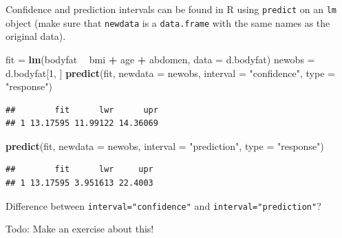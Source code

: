 \documentclass[10pt,ignorenonframetext,]{beamer}
\newenvironment{Shaded}{\begin{snugshade}}{\end{snugshade}}
\newcommand{\KeywordTok}[1]{\textcolor[rgb]{0.13,0.29,0.53}{\textbf{#1}}}
\newcommand{\DataTypeTok}[1]{\textcolor[rgb]{0.13,0.29,0.53}{#1}}
\newcommand{\DecValTok}[1]{\textcolor[rgb]{0.00,0.00,0.81}{#1}}
\newcommand{\StringTok}[1]{\textcolor[rgb]{0.31,0.60,0.02}{#1}}
\newcommand{\OperatorTok}[1]{\textcolor[rgb]{0.81,0.36,0.00}{\textbf{#1}}}
\newcommand{\NormalTok}[1]{#1}
\begin{document}
\begin{frame}[fragile]

Confidence and prediction intervals can be found in R using
\texttt{predict} on an \texttt{lm} object (make sure that
\texttt{newdata} is a \texttt{data.frame} with the same names as the
original data).

\footnotesize

\begin{Shaded}
\begin{Highlighting}[]
\NormalTok{fit =}\StringTok{ }\KeywordTok{lm}\NormalTok{(bodyfat }\OperatorTok{~}\StringTok{ }\NormalTok{bmi }\OperatorTok{+}\StringTok{ }\NormalTok{age }\OperatorTok{+}\StringTok{ }\NormalTok{abdomen, }\DataTypeTok{data =}\NormalTok{ d.bodyfat)}
\NormalTok{newobs =}\StringTok{ }\NormalTok{d.bodyfat[}\DecValTok{1}\NormalTok{, ]}
\KeywordTok{predict}\NormalTok{(fit, }\DataTypeTok{newdata =}\NormalTok{ newobs, }\DataTypeTok{interval =} \StringTok{"confidence"}\NormalTok{, }\DataTypeTok{type =} \StringTok{"response"}\NormalTok{)}
\end{Highlighting}
\end{Shaded}

\begin{verbatim}
##        fit      lwr      upr
## 1 13.17595 11.99122 14.36069
\end{verbatim}

\begin{Shaded}
\begin{Highlighting}[]
\KeywordTok{predict}\NormalTok{(fit, }\DataTypeTok{newdata =}\NormalTok{ newobs, }\DataTypeTok{interval =} \StringTok{"prediction"}\NormalTok{, }\DataTypeTok{type =} \StringTok{"response"}\NormalTok{)}
\end{Highlighting}
\end{Shaded}

\begin{verbatim}
##        fit      lwr     upr
## 1 13.17595 3.951613 22.4003
\end{verbatim}

Difference between \texttt{interval="confidence"} and
\texttt{interval="prediction"}?

Todo: Make an exercise about this!

\end{frame}
\end{document}
